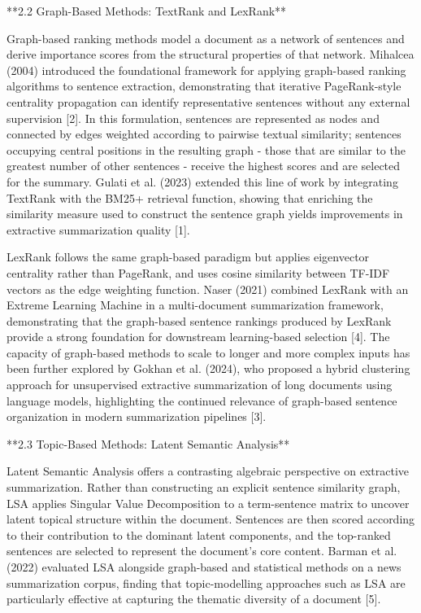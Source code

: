 \documentclass[10pt]{book}
\begin{document}
**2.2 Graph-Based Methods: TextRank and LexRank**

Graph-based ranking methods model a document as a network of sentences and derive importance scores from the structural properties of that network. Mihalcea (2004) introduced the foundational framework for applying graph-based ranking algorithms to sentence extraction, demonstrating that iterative PageRank-style centrality propagation can identify representative sentences without any external supervision [2]. In this formulation, sentences are represented as nodes and connected by edges weighted according to pairwise textual similarity; sentences occupying central positions in the resulting graph - those that are similar to the greatest number of other sentences - receive the highest scores and are selected for the summary. Gulati et al. (2023) extended this line of work by integrating TextRank with the BM25+ retrieval function, showing that enriching the similarity measure used to construct the sentence graph yields improvements in extractive summarization quality [1].

LexRank follows the same graph-based paradigm but applies eigenvector centrality rather than PageRank, and uses cosine similarity between TF-IDF vectors as the edge weighting function. Naser (2021) combined LexRank with an Extreme Learning Machine in a multi-document summarization framework, demonstrating that the graph-based sentence rankings produced by LexRank provide a strong foundation for downstream learning-based selection [4]. The capacity of graph-based methods to scale to longer and more complex inputs has been further explored by Gokhan et al. (2024), who proposed a hybrid clustering approach for unsupervised extractive summarization of long documents using language models, highlighting the continued relevance of graph-based sentence organization in modern summarization pipelines [3].

**2.3 Topic-Based Methods: Latent Semantic Analysis**

Latent Semantic Analysis offers a contrasting algebraic perspective on extractive summarization. Rather than constructing an explicit sentence similarity graph, LSA applies Singular Value Decomposition to a term-sentence matrix to uncover latent topical structure within the document. Sentences are then scored according to their contribution to the dominant latent components, and the top-ranked sentences are selected to represent the document's core content. Barman et al. (2022) evaluated LSA alongside graph-based and statistical methods on a news summarization corpus, finding that topic-modelling approaches such as LSA are particularly effective at capturing the thematic diversity of a document [5].
\end{document}
